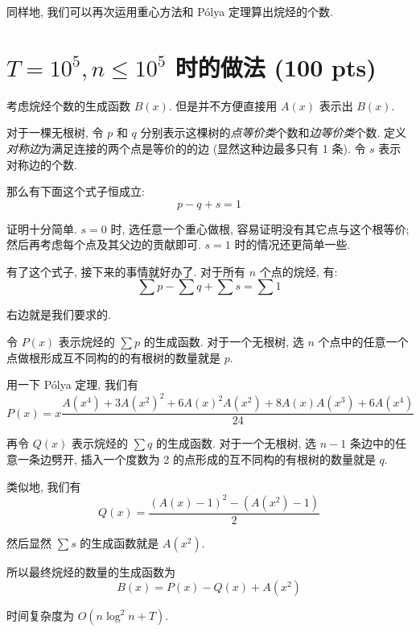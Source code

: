 \documentclass[a4paper]{article}
\begin{document}
同样地, 我们可以再次运用重心方法和 Pólya 定理算出烷烃的个数.

\section{$T = 10^5, n \le 10^5$ 时的做法 (100 pts)}
考虑烷烃个数的生成函数 $B(x)$.
但是并不方便直接用 $A(x)$ 表示出 $B(x)$.

对于一棵无根树, 令 $p$ 和 $q$ 分别表示这棵树的\emph{点等价类}个数和\emph{边等价类}个数.
定义\emph{对称边}为满足连接的两个点是等价的的边 (显然这种边最多只有 1 条).
令 $s$ 表示对称边的个数.
  
那么有下面这个式子恒成立:
$$p - q + s = 1$$

证明十分简单.
$s = 0$ 时, 选任意一个重心做根, 容易证明没有其它点与这个根等价; 然后再考虑每个点及其父边的贡献即可.
$s = 1$ 时的情况还更简单一些.
\bigskip

有了这个式子, 接下来的事情就好办了.
对于所有 $n$ 个点的烷烃, 有:
$$\sum p - \sum q + \sum s = \sum 1$$

右边就是我们要求的.

令 $P(x)$ 表示烷烃的 $\sum p$ 的生成函数.
对于一个无根树, 选 $n$ 个点中的任意一个点做根形成互不同构的的有根树的数量就是 $p$.

用一下 Pólya 定理, 我们有
$$P(x) = x \frac{A(x^4) + 3A(x^2)^2 + 6A(x)^2A(x^2) + 8A(x)A(x^3) + 6A(x^4)}{24}$$

再令 $Q(x)$ 表示烷烃的 $\sum q$ 的生成函数.
对于一个无根树, 选 $n - 1$ 条边中的任意一条边劈开, 插入一个度数为 2 的点形成的互不同构的有根树的数量就是 $q$.

类似地, 我们有
$$Q(x) = \frac{\left(A(x)-1\right)^2 - \left(A(x^2) - 1\right)}{2}$$

然后显然 $\sum s$ 的生成函数就是 $A(x^2)$.

所以最终烷烃的数量的生成函数为
$$B(x) = P(x) - Q(x) + A(x^2)$$

时间复杂度为 $O(n \log^2 n + T)$.
\end{document}
